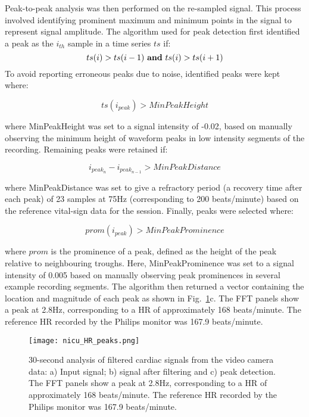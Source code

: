 Peak-to-peak analysis was then performed on the re-sampled signal. This process involved identifying prominent maximum and minimum points in the signal to represent signal amplitude. The algorithm used for peak detection first identified a peak as the $i _{th}$ sample in a time series $ts$ if: 
\begin{equation}
	ts(i) > ts(i-1)\textrm{ \textbf{and} } ts(i) > ts(i+1)
\end{equation}
To avoid reporting erroneous peaks due to noise, identified peaks were kept where:

\begin{equation}
	ts(i_{peak})  > MinPeakHeight
\end{equation}

where MinPeakHeight was set to a signal intensity of -0.02, based on manually observing the minimum height of waveform peaks in low intensity segments of the recording. Remaining peaks were retained if:

\begin{equation}
	i_{peak_{n}} - i_{peak_{n-1}}  >  MinPeakDistance
\end{equation}

where MinPeakDistance was set to give a refractory period (a recovery time after each peak) of 23 samples at 75Hz (corresponding to 200 beats/minute) based on the reference vital-sign data for the session. Finally, peaks were selected where:

\begin{equation}
	prom(i_{peak}) > MinPeakProminence
\end{equation}

where $prom$ is the prominence of a peak, defined as the height of the peak relative to neighbouring troughs. Here, MinPeakProminence was set to a signal intensity of 0.005 based on manually observing peak prominences in several example recording segments. The algorithm then returned a vector containing the location and magnitude of each peak as shown in Fig.~\ref{HR_peaks}c. The FFT panels show a peak at 2.8Hz, corresponding to a HR of approximately 168 beats/minute. The reference HR recorded by the Philips monitor was 167.9 beats/minute.

 \begin{center}
\begin{figure}[H]
\centering
\texttt{[image: nicu\_HR\_peaks.png]}
    \caption[30-second analysis of filtered cardiac signals from the video camera data.]{30-second analysis of filtered cardiac signals from the video camera data: a) Input signal; b) signal after filtering and c) peak detection. The FFT panels show a peak at 2.8Hz, corresponding to a HR of approximately 168 beats/minute. The reference HR recorded by the Philips monitor was 167.9 beats/minute.}
    \label{HR_peaks}
    \end{figure}
 \end{center}
 
